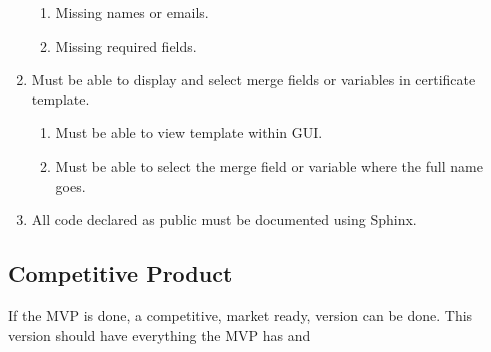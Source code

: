 \documentclass[11pt]{article}
\begin{document}
\begin{enumerate}
\begin{enumerate}
        \item Missing names or emails.
        \item Missing required fields.
    \end{enumerate}
    \item Must be able to display and select merge fields or variables in certificate template.
    \begin{enumerate}
        \item Must be able to view template within GUI.
        \item Must be able to select the merge field or variable where the full name goes.
    \end{enumerate}
    \item All code declared as public must be documented using Sphinx.
\end{enumerate}

\subsection{Competitive Product}

If the MVP is done, a competitive, market ready, version can be done. This version should have everything the MVP has and
\end{document}
